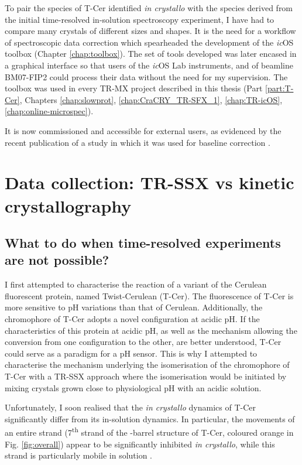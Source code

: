 To pair the species of T-Cer identified \textit{in crystallo} with the species derived from the initial time-resolved in-solution spectroscopy experiment, I have had to compare many crystals of different sizes and shapes. It is the need for a workflow of spectroscopic data correction which spearheaded the development of the \textit{ic}OS toolbox (Chapter \ref{chap:toolbox}). The set of tools developed was later encased in a graphical interface so that users of the \textit{ic}OS Lab instruments, and of beamline BM07-FIP2 could process their data without the need for my supervision. The toolbox was used in every TR-MX project described in this thesis (Part \ref{part:T-Cer}, Chapters \ref{chap:slowprot}, \ref{chap:CraCRY_TR-SFX_1}, \ref{chap:TR-icOS}, \ref{chap:online-microspec}).

It is now commissioned and accessible for external users, as evidenced by the recent publication of a study in which it was used for baseline correction \parencite{roseSpectroscopicallyValidatedPHdependent2024}. 


\section{Data collection: TR-SSX vs kinetic crystallography}

\subsection{What to do when time-resolved experiments are not possible?}
I first attempted to characterise the reaction of a variant of the Cerulean fluorescent protein, named Twist-Cerulean (T-Cer). The fluorescence of T-Cer is more sensitive to pH variations than that of Cerulean. Additionally, the chromophore of T-Cer adopts a novel configuration at acidic pH. If the characteristics of this protein at acidic pH, as well as the mechanism allowing the conversion from one configuration to the other, are better understood, T-Cer could serve as a paradigm for a pH sensor. This is why I attempted to characterise the mechanism underlying the isomerisation of the chromophore of T-Cer with a TR-SSX approach where the isomerisation would be initiated by mixing crystals grown close to physiological pH with an acidic solution. 
\vspace{2mm}

Unfortunately, I soon realised that the \textit{in crystallo} dynamics of T-Cer significantly differ from its in-solution dynamics. In particular, the movements of an entire strand (7\textsuperscript{th} strand of the \textbeta-barrel structure of T-Cer, coloured orange in Fig. \ref{fig:overall}) appear to be significantly inhibited \textit{in crystallo}, while this strand is particularly mobile in solution \parencite{lelimousinIntrinsicDynamicsECFP2009}. 

